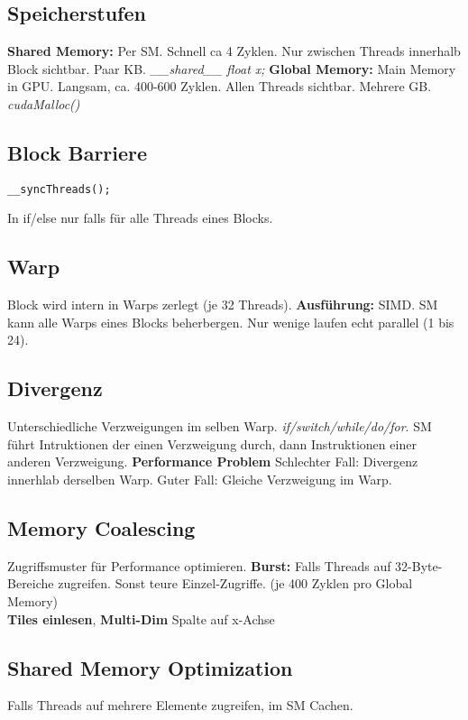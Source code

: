 \subsection{Speicherstufen}
\textbf{Shared Memory:} Per SM.
Schnell ca 4 Zyklen.
Nur zwischen Threads innerhalb Block sichtbar.
Paar KB.
\textit{\_\_shared\_\_ float x;}
\textbf{Global Memory:}
Main Memory in GPU.
Langsam, ca. 400-600 Zyklen.
Allen Threads sichtbar.
Mehrere GB.
\textit{cudaMalloc()}

\subsection{Block Barriere}
\begin{lstlisting}
__syncThreads();
\end{lstlisting}
In if/else nur falls für alle Threads eines Blocks.

\subsection{Warp}
Block wird intern in Warps zerlegt (je 32 Threads).
\textbf{Ausführung:} SIMD.
SM kann alle Warps eines Blocks beherbergen. Nur wenige laufen echt parallel (1 bis 24).

\subsection{Divergenz}
Unterschiedliche Verzweigungen im selben Warp.
\textit{if/switch/while/do/for}.
SM führt Intruktionen der einen Verzweigung durch, dann Instruktionen einer anderen Verzweigung.
\textbf{Performance Problem}
Schlechter Fall: Divergenz innerhlab derselben Warp.
Guter Fall: Gleiche Verzweigung im Warp.

\subsection{Memory Coalescing}
Zugriffsmuster für Performance optimieren.
\textbf{Burst:}  Falls Threads auf 32-Byte-Bereiche zugreifen.
Sonst teure Einzel-Zugriffe. (je 400 Zyklen pro Global Memory)\\ 
\textbf{Tiles einlesen}, \textbf{Multi-Dim} Spalte auf x-Achse

\subsection{Shared Memory Optimization}
Falls Threads auf mehrere Elemente zugreifen, im SM Cachen.

